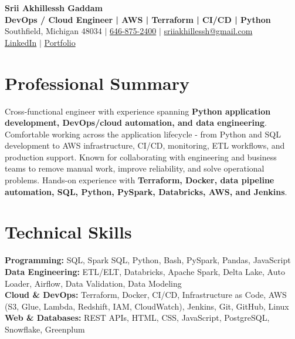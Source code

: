 \documentclass[letterpaper,10pt]{article}
\begin{document}
\fontsize{9.35pt}{10.45pt}\selectfont

\begin{center}
    {\LARGE \textbf{Srii Akhillessh Gaddam}} \\[-1pt]
    \textbf{DevOps / Cloud Engineer | AWS | Terraform | CI/CD | Python} \\[2pt]
    Southfield, Michigan 48034 $|$
    \href{tel:6468752400}{646-875-2400} $|$
    \href{mailto:sriiakhillessh@gmail.com}{sriiakhillessh@gmail.com} \\[1pt]
    \href{https://www.linkedin.com/in/srii-akhiilessh-gaddam-b48668191/}{LinkedIn} $|$
    \href{https://sriiakhillesshg.github.io/portfolio/}{Portfolio}
\end{center}
\vspace{-8pt}

\section{Professional Summary}
\small{Cross-functional engineer with experience spanning \textbf{Python application development, DevOps/cloud automation, and data engineering}. Comfortable working across the application lifecycle - from Python and SQL development to AWS infrastructure, CI/CD, monitoring, ETL workflows, and production support. Known for collaborating with engineering and business teams to remove manual work, improve reliability, and solve operational problems. Hands-on experience with \textbf{Terraform, Docker, data pipeline automation, SQL, Python, PySpark, Databricks, AWS, and Jenkins}.}

\section{Technical Skills}
\small{
\textbf{Programming:} SQL, Spark SQL, Python, Bash, PySpark, Pandas, JavaScript \\
\textbf{Data Engineering:} ETL/ELT, Databricks, Apache Spark, Delta Lake, Auto Loader, Airflow, Data Validation, Data Modeling \\
\textbf{Cloud \& DevOps:} Terraform, Docker, CI/CD, Infrastructure as Code, AWS (S3, Glue, Lambda, Redshift, IAM, CloudWatch), Jenkins, Git, GitHub, Linux \\
\textbf{Web \& Databases:} REST APIs, HTML, CSS, JavaScript, PostgreSQL, Snowflake, Greenplum
}
\end{document}
